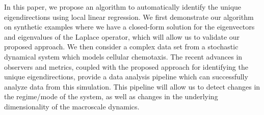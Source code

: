 \documentclass[preprint]{elsarticle}
\begin{document}
In this paper, we propose an algorithm to automatically identify the unique eigendirections using local linear regression.
%
We first demonstrate our algorithm on synthetic examples where we have a closed-form solution for the eigenvectors and eigenvalues of the Laplace operator, which will allow us to validate our proposed approach.
%
We then consider a complex data set from a stochastic dynamical system which models cellular chemotaxis. 
%
The recent advances in observers and metrics, coupled with the proposed approach for identifying the unique eigendirections, provide a data analysis pipeline which can successfully analyze data from this simulation.
%
This pipeline will allow us to detect changes in the regime/mode of the system, as well as changes in the underlying dimensionality of the macroscale dynamics.  
\end{document}
